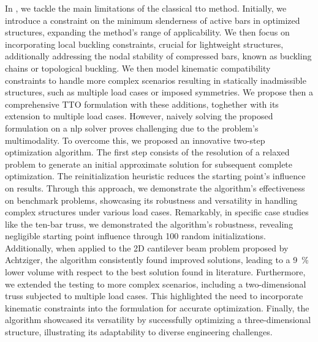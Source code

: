 In , we tackle the main limitations of the classical \gls{tto} method. Initially, we introduce a constraint on the minimum slenderness of active bars in optimized structures, expanding the method's range of applicability. We then focus on incorporating local buckling constraints, crucial for lightweight structures, additionally addressing the nodal stability of compressed bars, known as buckling chains or topological buckling. We then model kinematic compatibility constraints to handle more complex scenarios resulting in statically inadmissible structures, such as multiple load cases or imposed symmetries. We propose then a comprehensive TTO formulation with these additions, toghether with its extension to multiple load cases. However, naively solving the proposed formulation on a \gls{nlp} solver proves challenging due to the problem's multimodality. To overcome this, we proposed an innovative two-step optimization algorithm. The first step consists of the resolution of a relaxed problem to generate an initial approximate solution for subsequent complete optimization. The reinitialization heuristic reduces the starting point's influence on results. Through this approach, we demonstrate the algorithm's effectiveness on benchmark problems, showcasing its robustness and versatility in handling complex structures under various load cases. Remarkably, in specific case studies like the ten-bar truss, we demonstrated the algorithm's robustness, revealing negligible starting point influence through 100 random initializations. Additionally, when applied to the 2D cantilever beam problem proposed by Achtziger, the algorithm consistently found improved solutions, leading to a \qty{9}{\%} lower volume with respect to the best solution found in literature. Furthermore, we extended the testing to more complex scenarios, including a two-dimensional truss subjected to multiple load cases. This highlighted the need to incorporate kinematic constraints into the formulation for accurate optimization. Finally, the algorithm showcased its versatility by successfully optimizing a three-dimensional structure, illustrating its adaptability to diverse engineering challenges.

